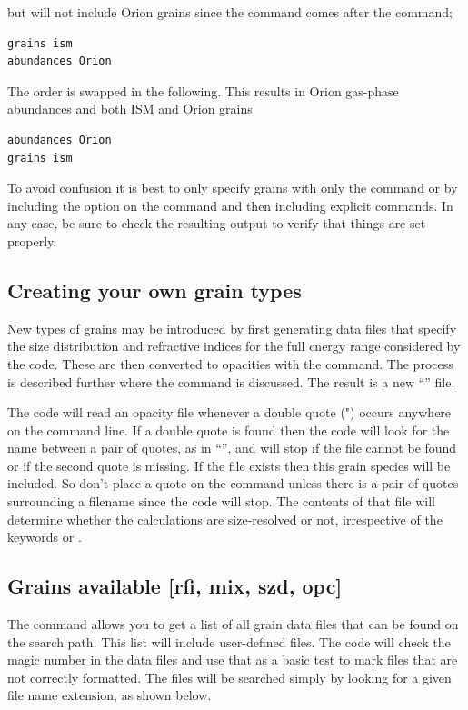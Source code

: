 but will not include
Orion grains since the  command comes after the  command;
\begin{verbatim}
grains ism
abundances Orion
\end{verbatim}
The order is swapped in the following.
This results in Orion gas-phase
abundances and both ISM and Orion grains
\begin{verbatim}
abundances Orion
grains ism
\end{verbatim}
To avoid confusion it is best to only specify grains with only
the 
command or by including the  option on the  command
and then including explicit  commands.
In any case, be sure to check
the resulting output to verify that things are set properly.

\subsection{Creating your own grain types}

New types of grains may be introduced by first generating data files
that specify the size distribution  and refractive indices for the full
energy range considered by the code.
These are then converted to opacities
with the  command.
The process is described further where
the  command is discussed.
The result is a new ``'' file.

The code will read an opacity file whenever a double quote (") occurs
anywhere on the command line.
If a double quote is found then the code
will look for the name between a pair of quotes, as in
``'',
and will stop if the file cannot be found or if the second quote
is missing.
If the file exists then this grain species will be included.
So don't place
a quote on the  command unless there is a pair
of quotes surrounding
a filename since the code will stop.
The contents of that file will
determine whether the calculations are size-resolved or not,
irrespective
of the keywords  or .

\subsection{Grains available [rfi, mix, szd, opc]}

The command  allows you to get a list of all grain
data files that can be found on the search path. This list will include
user-defined files. The code will check the magic number in the data files and
use that as a basic test to mark files that are not correctly formatted.
The files will be searched simply by looking for a given file name extension, as
shown below.

